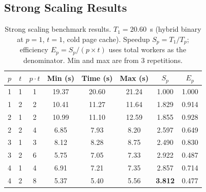 \documentclass[12pt,a4paper]{article}
\begin{document}
\subsection{Strong Scaling Results}

\begin{table}[H]
  \centering
  \caption{Strong scaling benchmark results. $T_1 = 20.60$~s
           (hybrid binary at $p=1$, $t=1$, cold page cache).
           Speedup $S_p = T_1/T_p$;
           efficiency $E_p = S_p / (p \times t)$ uses total workers as the denominator.
           Min and max are from 3 repetitions.}
  \label{tab:results}
  \begin{tabular}{cccc cc c c}
    \toprule
    $p$ & $t$ & $p{\cdot}t$ & Min (s) & Time (s) & Max (s) & $S_p$ & $E_p$ \\
    \midrule
    1 & 1 & 1 & 19.37 & 20.60 & 21.24 & 1.000 & 1.000 \\
    1 & 2 & 2 & 10.41 & 11.27 & 11.64 & 1.829 & 0.914 \\
    2 & 1 & 2 & 10.99 & 11.10 & 12.59 & 1.855 & 0.928 \\
    2 & 2 & 4 &  6.85 &  7.93 &  8.20 & 2.597 & 0.649 \\
    3 & 1 & 3 &  8.12 &  8.28 &  8.75 & 2.490 & 0.830 \\
    3 & 2 & 6 &  5.75 &  7.05 &  7.33 & 2.922 & 0.487 \\
    4 & 1 & 4 &  6.91 &  7.21 &  7.35 & 2.857 & 0.714 \\
    4 & 2 & 8 &  5.37 &  5.40 &  5.56 & \textbf{3.812} & 0.477 \\
    \bottomrule
  \end{tabular}
\end{table}
\end{document}
